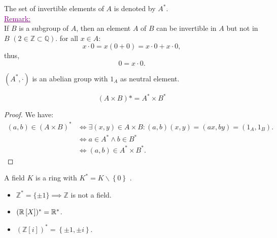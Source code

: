  The set of invertible elements of $A$ is denoted by $A^{*}$. \\
 \noindent
 \textcolor{purple}{
 \underline{
 Remark:
 }
 }\\
 If $B$ is a subgroup of $A$, then an element $A$ of $B$ can be invertible in $A$ but not in $B$ $(2 \in  \mathbb{Z} \subset \mathbb{Q})$. for all $x \in   A:$ 
 \[
 x \cdot  0 = x ( 0 + 0)  = x \cdot  0 + x \cdot  0,
 \]
 thus,
 \[
  0 = x \cdot  0.
 \]
 \begin{proposition}[]
 $(A ^{*}, \cdot ) $ is an abelian group with $1_{A}$ as neutral element.
 \end{proposition}
 \begin{proposition}[]
   \[
     (A \times B ) * = A^{*} \times B^{*} 
   \]
 \end{proposition}
 \begin{proof}
   We have:
   \begin{align*}
     (a,b) \in   (A \times B ) ^{*} & \iff 
     \exists (x,y)  \in   A \times B: 
     (a,b) (x,y)  = (ax, by) = (1_{A}, 1_{B}) .\\
                                    & \iff a \in  A^{*} \wedge  b \in   B^{*}\\
                                    & \iff (a,b) \in  A^{*} \times B^{*} .
   \end{align*}
 \end{proof}
 \begin{definition}[]
   A field $K$ is a ring with $K^{*} = K \backslash \left\{ 0 \right\}$ .
 \end{definition}
 \begin{example}
 \begin{itemize}
   \item [\ding{172} ] $\mathbb{Z}^{*} = \{ \pm 1\} \implies \mathbb{Z}$ is not a field.
   \item[\ding{173} ] $(\mathbb{R} \left[ X \right]) ^{*} = \mathbb{R} ^{*}$.
   \item [\ding{174} ] $(\mathbb{Z}[i]) ^{*} = \left\{ \pm 1, \pm i \right\}$.
 \end{itemize}
 \end{example}
